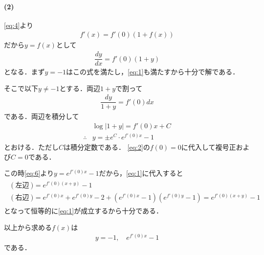 \documentclass[../../main.tex]{subfiles}
\begin{document}
\paragraph{(2)}

\cref{eq:4}より
\begin{align}
  f'(x) = f'(0)(1+f(x))
\end{align}
だから$y=f(x)$として
\begin{align}
  \dfrac{dy}{dx}=f'(0)(1+y)
\end{align}
となる．まず$y=-1$はこの式を満たし，\cref{eq:1}も満たすから十分で解である．

そこで以下$y\neq -1$とする．両辺$1+y$で割って
\begin{align}
  \dfrac{dy}{1+y} = f'(0) dx \label{eq:5}
\end{align}
である．両辺を積分して
\begin{align}
  & \log |1+y| =f'(0)x+C \\
  \therefore
  & y=\pm e^C \cdot e^{f'(0)x}-1 \label{eq:6}
\end{align}
とおける．ただし$C$は積分定数である．
\cref{eq:2}の$f(0)=0$に代入して複号正および$C=0$である．

この時\cref{eq:6}より$y=e^{f'(0)x}-1$だから，\cref{eq:1}に代入すると
\begin{align}
  \begin{split}
    (\text{左辺})&=e^{f'(0)(x+y)}-1 \\
    (\text{右辺})&=e^{f'(0)x}+e^{f'(0)y}-2+(e^{f'(0)x}-1)(e^{f'(0)y}-1)=e^{f'(0)(x+y)}-1
  \end{split}
\end{align}
となって恒等的に\cref{eq:1}が成立するから十分である．

以上から求める$f(x)$は
\begin{align}
  y=-1,\quad e^{f'(0)x}-1
\end{align}
である．

\newpage
\end{document}
